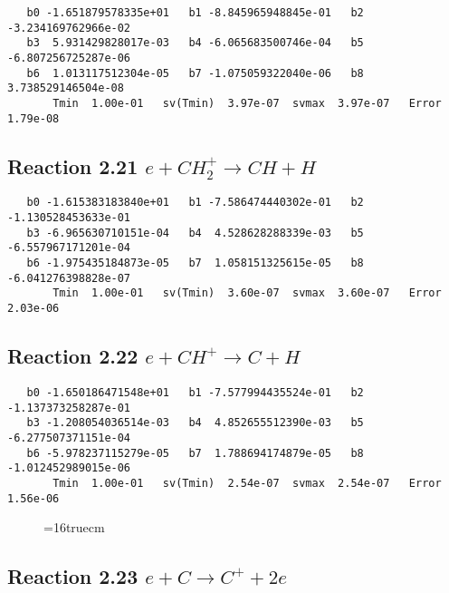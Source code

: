 \documentclass[12pt]{article}
\begin{document}
\begin{small}\begin{verbatim} 
   b0 -1.651879578335e+01   b1 -8.845965948845e-01   b2 -3.234169762966e-02
   b3  5.931429828017e-03   b4 -6.065683500746e-04   b5 -6.807256725287e-06
   b6  1.013117512304e-05   b7 -1.075059322040e-06   b8  3.738529146504e-08
       Tmin  1.00e-01   sv(Tmin)  3.97e-07  svmax  3.97e-07   Error  1.79e-08
\end{verbatim}\end{small}

\subsection{ 
Reaction 2.21     $e + CH_2^+ \rightarrow CH + H$
}

\begin{small}\begin{verbatim} 
   b0 -1.615383183840e+01   b1 -7.586474440302e-01   b2 -1.130528453633e-01
   b3 -6.965630710151e-04   b4  4.528628288339e-03   b5 -6.557967171201e-04
   b6 -1.975435184873e-05   b7  1.058151325615e-05   b8 -6.041276398828e-07
       Tmin  1.00e-01   sv(Tmin)  3.60e-07  svmax  3.60e-07   Error  2.03e-06
\end{verbatim}\end{small}


\subsection{ 
Reaction 2.22     $e + CH^+ \rightarrow C + H$
}

\begin{small}\begin{verbatim} 
   b0 -1.650186471548e+01   b1 -7.577994435524e-01   b2 -1.137373258287e-01
   b3 -1.208054036514e-03   b4  4.852655512390e-03   b5 -6.277507371151e-04
   b6 -5.978237115279e-05   b7  1.788694174879e-05   b8 -1.012452989015e-06
       Tmin  1.00e-01   sv(Tmin)  2.54e-07  svmax  2.54e-07   Error  1.56e-06
\end{verbatim}\end{small}

\begin{figure} \label{met.2_2.20.2}
\epsfxsize=16truecm
\end{figure}
\newpage
 
\subsection{ 
Reaction 2.23     $e + C \rightarrow C^+ + 2e$
}
\end{document}
